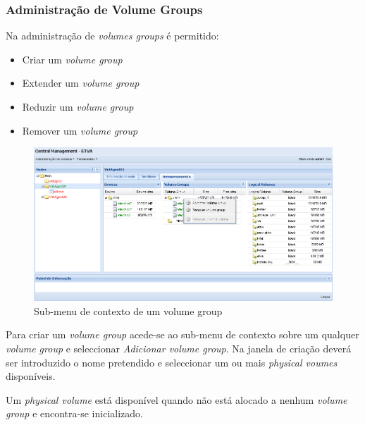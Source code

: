 
\subsubsection{Administração de Volume Groups}
Na administração de \emph{volumes groups} é permitido:
\begin{itemize}
	\item Criar um \emph{volume group}
	\item Extender um \emph{volume group}
	\item Reduzir um \emph{volume group}
	\item Remover um \emph{volume group}
\end{itemize}

\begin{figure}[H]
        \begin{center}
        \includegraphics[scale=0.45]{screenshots/node_storage_vg_ctx.png}
        \caption{Sub-menu de contexto de um volume group}
        \label{fig:storage_vg_ctx}
        \end{center}
\end{figure}

Para criar um \emph{volume group} acede-se ao sub-menu de contexto sobre um qualquer \emph{volume group} e seleccionar \emph{Adicionar volume group}.
Na janela de criação deverá ser introduzido o nome pretendido e seleccionar um ou mais \emph{physical voumes} disponíveis.

Um \emph{physical volume} está disponível quando não está alocado a nenhum \emph{volume group} e encontra-se inicializado.


